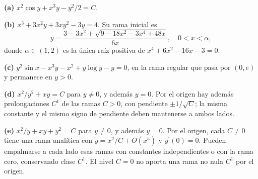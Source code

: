 \noindent\textbf{(a)} $x^2\cos y+x^3y-y^2/2=C$.

\noindent\textbf{(b)} $x^3+3x^2y+3xy^2-3y=4$. Su rama inicial es\[y=\frac{3-3x^2+\sqrt{9-18x^2-3x^4+48x}}{6x},\quad 0<x<\alpha,\]donde $\alpha\in(1,2)$ es la única raíz positiva de $x^4+6x^2-16x-3=0$.

\noindent\textbf{(c)} $y^2\sin x-x^3y-x^2+y\log y-y=0$, en la rama regular que pasa por $(0,e)$ y permanece en $y>0$.

\noindent\textbf{(d)} $x^2/y^2+xy=C$ para $y\ne0$, y además $y=0$. Por el origen hay además prolongaciones $C^1$ de las ramas $C>0$, con pendiente $\pm1/\sqrt C$; la misma constante y el mismo signo de pendiente deben mantenerse a ambos lados.

\noindent\textbf{(e)} $x^2/y+xy+y^2=C$ para $y\ne0$, y además $y=0$. Por el origen, cada $C\ne0$ tiene una rama analítica con $y=x^2/C+O(x^5)$ y $y^{\prime}(0)=0$. Pueden empalmarse a cada lado esas ramas con constantes independientes o con la rama cero, conservando clase $C^1$. El nivel $C=0$ no aporta una rama no nula $C^1$ por el origen.
